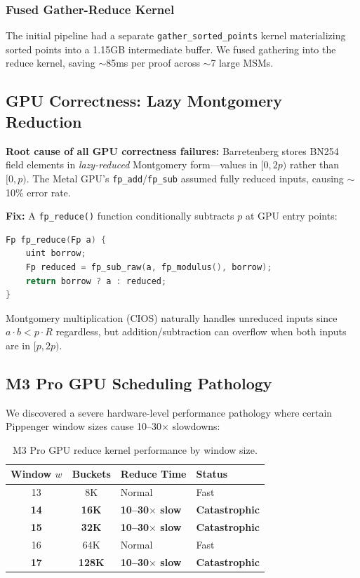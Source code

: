 \documentclass[11pt,a4paper]{article}
\begin{document}
\subsubsection{Fused Gather-Reduce Kernel}

The initial pipeline had a separate \texttt{gather\_sorted\_points} kernel materializing sorted points into a 1.15GB intermediate buffer. We fused gathering into the reduce kernel, saving $\sim$85ms per proof across $\sim$7 large MSMs.

\subsection{GPU Correctness: Lazy Montgomery Reduction}

\textbf{Root cause of all GPU correctness failures:} Barretenberg stores BN254 field elements in \emph{lazy-reduced} Montgomery form---values in $[0, 2p)$ rather than $[0, p)$. The Metal GPU's \texttt{fp\_add}/\texttt{fp\_sub} assumed fully reduced inputs, causing $\sim$10\% error rate.

\textbf{Fix:} A \texttt{fp\_reduce()} function conditionally subtracts $p$ at GPU entry points:

\begin{lstlisting}[language=C]
Fp fp_reduce(Fp a) {
    uint borrow;
    Fp reduced = fp_sub_raw(a, fp_modulus(), borrow);
    return borrow ? a : reduced;
}
\end{lstlisting}

Montgomery multiplication (CIOS) naturally handles unreduced inputs since $a \cdot b < p \cdot R$ regardless, but addition/subtraction can overflow when both inputs are in $[p, 2p)$.

\subsection{M3 Pro GPU Scheduling Pathology}

We discovered a severe hardware-level performance pathology where certain Pippenger window sizes cause 10--30$\times$ slowdowns:

\begin{table}[H]
\centering
\begin{tabular}{ccll}
\toprule
\textbf{Window $w$} & \textbf{Buckets} & \textbf{Reduce Time} & \textbf{Status} \\
\midrule
13 & 8K & Normal & Fast \\
\textbf{14} & \textbf{16K} & \textbf{10--30$\times$ slow} & \textbf{Catastrophic} \\
\textbf{15} & \textbf{32K} & \textbf{10--30$\times$ slow} & \textbf{Catastrophic} \\
16 & 64K & Normal & Fast \\
\textbf{17} & \textbf{128K} & \textbf{10--30$\times$ slow} & \textbf{Catastrophic} \\
\bottomrule
\end{tabular}
\caption{M3 Pro GPU reduce kernel performance by window size.}
\end{table}
\end{document}
